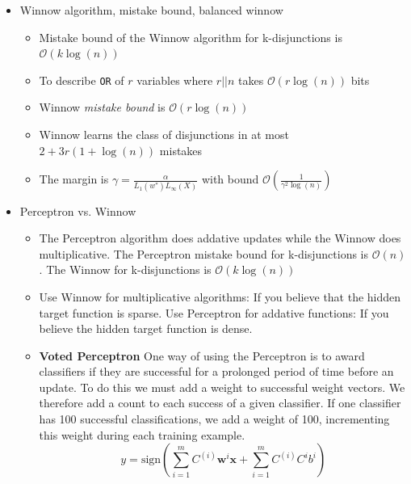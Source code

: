\documentclass{article}
\begin{document}
\begin{itemize}
\begin{itemize}
	\end{itemize}
\item Winnow algorithm, mistake bound, balanced winnow
	\begin{itemize}
	\item Mistake bound of the Winnow algorithm for k-disjunctions is $\mathcal{O}(k\log(n))$
	\item To describe \verb~OR~ of $r$ variables where $r || n$ takes $\mathcal{O}(r\log(n))$ bits
	\item Winnow {\em mistake bound} is $\mathcal{O}(r\log(n))$
	\item Winnow learns the class of disjunctions in at most $2 + 3r(1+\log(n))$ mistakes
	\item The margin is $\gamma = \frac{\alpha}{L_{1}(w^{*})L_{\infty}(X)}$ with bound $\mathcal{O}\left( \frac{1}{\gamma^{2}\log(n)}\right)$
	\end{itemize}
\item Perceptron vs. Winnow
	\begin{itemize}
	\item The Perceptron algorithm does addative updates while the Winnow does multiplicative. The Perceptron mistake bound for k-disjunctions is $\mathcal{O}(n)$. The Winnow for k-disjunctions is $\mathcal{O}(k\log(n))$
	\item Use Winnow for multiplicative algorithms: If you believe that the hidden target function is sparse. Use Perceptron for addative functions: If you believe the hidden target function is dense.
	\item {\bf Voted Perceptron} One way of using the Perceptron is to award classifiers if they are successful for a prolonged period of time before an update. To do this we must add a weight to successful weight vectors. We therefore add a count to each success of a given classifier. If one classifier has 100 successful classifications, we add a weight of 100, incrementing this weight during each training example.
	\[
	y = \text{sign}\left(\sum_{i=1}^{m}C^{(i)}\mathbf{w}^{i}\mathbf{x} + \sum_{i=1}^{m}C^{(i)}C^{i}b^{i} \right)
	\]
	\end{itemize}
\end{itemize}
\end{document}
